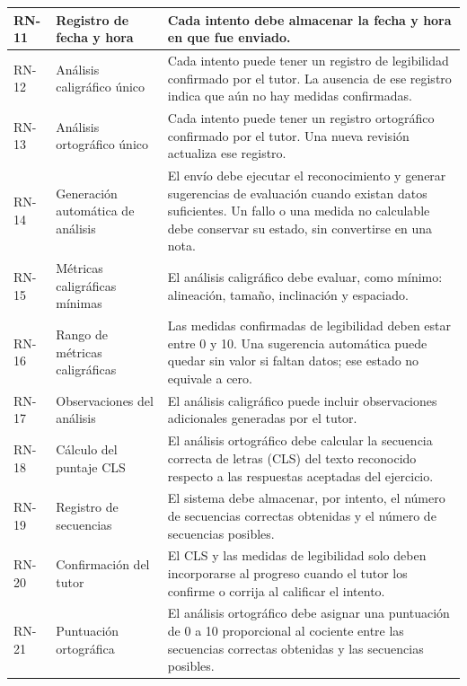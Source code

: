 \begin{longtable}{|>{\centering\arraybackslash}m{2cm}|m{3.6cm}|
  Y{\dimexpr\textwidth-5.6cm-6\arrayrulewidth\relax}|}
RN-11 & Registro de fecha y hora &
Cada intento debe almacenar la fecha y hora en que fue enviado. \\ \hline

RN-12 & Análisis caligráfico único &
Cada intento puede tener un registro de legibilidad confirmado por el tutor. La ausencia de ese registro indica que aún no hay medidas confirmadas. \\ \hline

RN-13 & Análisis ortográfico único &
Cada intento puede tener un registro ortográfico confirmado por el tutor. Una nueva revisión actualiza ese registro. \\ \hline

RN-14 & Generación automática de análisis &
El envío debe ejecutar el reconocimiento y generar sugerencias de evaluación cuando existan datos suficientes. Un fallo o una medida no calculable debe conservar su estado, sin convertirse en una nota. \\ \hline

RN-15 & Métricas caligráficas mínimas &
El análisis caligráfico debe evaluar, como mínimo: alineación, tamaño, inclinación y espaciado. \\ \hline

RN-16 & Rango de métricas caligráficas &
Las medidas confirmadas de legibilidad deben estar entre 0 y 10. Una sugerencia automática puede quedar sin valor si faltan datos; ese estado no equivale a cero. \\ \hline

RN-17 & Observaciones del análisis &
El análisis caligráfico puede incluir observaciones adicionales generadas por el tutor. \\ \hline

RN-18 & Cálculo del puntaje CLS &
El análisis ortográfico debe calcular la secuencia correcta de letras (CLS) del texto reconocido respecto a las respuestas aceptadas del ejercicio. \\ \hline

RN-19 & Registro de secuencias &
El sistema debe almacenar, por intento, el número de secuencias correctas obtenidas y el número de secuencias posibles. \\ \hline

RN-20 & Confirmación del tutor &
El CLS y las medidas de legibilidad solo deben incorporarse al progreso cuando el tutor los confirme o corrija al calificar el intento. \\ \hline

RN-21 & Puntuación ortográfica &
El análisis ortográfico debe asignar una puntuación de 0 a 10 proporcional al cociente entre las secuencias correctas obtenidas y las secuencias posibles. \\ \hline


\end{longtable}
